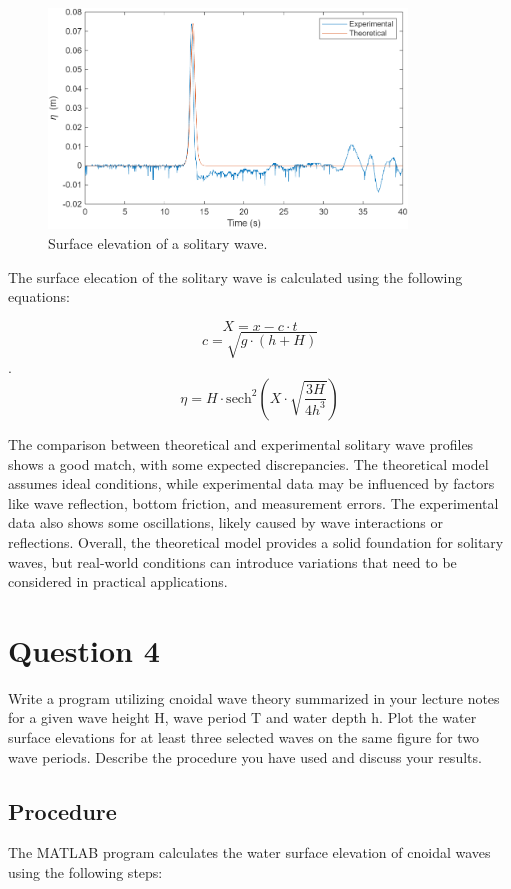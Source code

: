 \documentclass[a4paper]{article}
\begin{document}
\begin{figure}[H]
    \centering
    \includegraphics[width=0.85\textwidth]{CE591HW1-Q3.png}
    \caption{\small Surface elevation of a solitary wave.}
    \label{fig:plot3}
\end{figure} 

The surface elecation of the solitary wave is calculated using the following equations:

\[X = x - c \cdot t\] 
\[c = \sqrt{g \cdot (h+H)}\]. 
\[\eta = H \cdot \text{sech}^2\left(X \cdot \sqrt{\frac{3H}{4h^3}}\right)\]

The comparison between theoretical and experimental solitary wave profiles shows a good match, with some expected discrepancies. The theoretical model assumes ideal conditions, while experimental data may be influenced by factors like wave reflection, bottom friction, and measurement errors. The experimental data also shows some oscillations, likely caused by wave interactions or reflections. Overall, the theoretical model provides a solid foundation for solitary waves, but real-world conditions can introduce variations that need to be considered in practical applications.

\section{Question 4} Write a program utilizing cnoidal wave theory summarized in your lecture notes for a given wave height H, wave period T and water depth h. Plot the water surface elevations for at least three selected waves on the same figure for two wave periods. Describe the procedure you have used and discuss your results.

\subsection*{Procedure}
The MATLAB program calculates the water surface elevation of cnoidal waves using the following steps:
\end{document}
